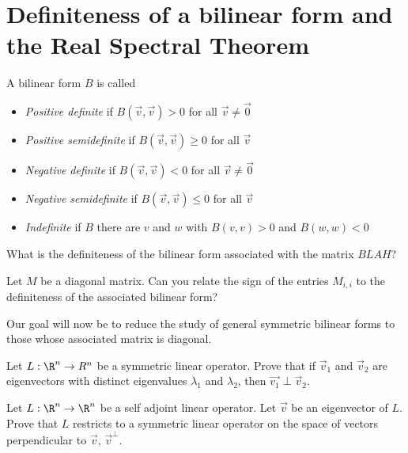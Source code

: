
\section{Definiteness of a bilinear form and the Real Spectral Theorem}

\begin{definition}
	A bilinear form $B$ is called 
	\begin{itemize}
		\item \textit{Positive definite} if $B(\vec{v},\vec{v}) > 0 $ for all $\vec{v} \neq \vec{0}$
		\item \textit{Positive semidefinite} if $B(\vec{v},\vec{v}) \geq 0 $ for all $\vec{v}$
		\item \textit{Negative definite} if $B(\vec{v},\vec{v}) < 0 $ for all $\vec{v} \neq \vec{0}$
		\item \textit{Negative semidefinite} if $B(\vec{v},\vec{v}) \leq 0 $ for all $\vec{v}$	
		\item \textit{Indefinite} if $B$ there are $v$ and $w$ with $B(v,v)>0$ and $B(w,w)<0$
		\end{itemize}
\end{definition}

\begin{question}
	What is the definiteness of the bilinear form associated with the matrix $BLAH$?
\end{question}

\begin{question}
	Let $M$ be a diagonal matrix.  Can you relate the sign of the entries $M_{i,i}$ to the definiteness of the associated bilinear form? 
\end{question}

Our goal will now be to reduce the study of general symmetric bilinear forms to those whose associated matrix is diagonal.

\begin{question}
	Let $L: \R^n \to R^n$ be a symmetric linear operator.  Prove that if $\vec{v}_1$ and $\vec{v}_2$ are eigenvectors with 
	distinct eigenvalues $\lambda_1$  and $\lambda_2$, then $\vec{v_1} \perp \vec{v}_2$.
\end{question}

\begin{question}
	Let $L:\R^n \to \R^n$ be a self adjoint linear operator.  Let $\vec{v}$ be an eigenvector of $L$.  Prove that $L$ restricts to a symmetric linear operator
	on the space of vectors perpendicular to $\vec{v}$,  $\vec{v}^\perp$.  
\end{question}

